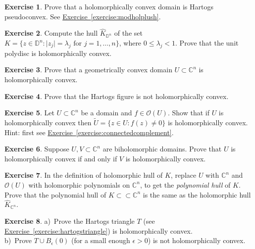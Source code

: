 \documentclass[12pt,openany]{book}
\newcommand{\sabs}[1]{\lvert {#1} \rvert}
\newcommand{\C}{{\mathbb{C}}}
\newcommand{\D}{{\mathbb{D}}}
\newcommand{\sO}{{\mathscr{O}}}
\newcommand{\myindex}[1]{#1\index{#1}}
\theoremstyle{plain}
\theoremstyle{remark}
\theoremstyle{definition}
\newenvironment{exbox}{%
    \def\FrameCommand{\vrule width 1pt \relax\hspace {10pt}}%
    \MakeFramed {\advance \hsize -\width \FrameRestore }%
}{%
    \endMakeFramed
}
\theoremstyle{exercise}
\newtheorem{exercise}{Exercise}[section]
\theoremstyle{example}
\newcommand{\exerciseref}[1]{\hyperref[#1]{Exercise~\ref*{#1}}}
\begin{document}
\begin{exbox}
\begin{exercise}
Prove that a holomorphically convex domain is Hartogs pseudoconvex.
See \exerciseref{exercise:modholplush}.
\end{exercise}

\begin{exercise}
Compute the hull
$\widehat{K}_{\D^n}$ of the set $K = \bigl\{ z \in \D^n : \sabs{z_j} =
\lambda_j \text{ for } j=1,\ldots,n \bigr\}$, where $0 \leq \lambda_j < 1$.
Prove that the unit polydisc is holomorphically convex.
\end{exercise}

\begin{exercise}
Prove that a geometrically convex domain $U \subset \C^n$
is holomorphically convex.
\end{exercise}

\begin{exercise}
Prove that the Hartogs figure is not holomorphically convex.
\end{exercise}

\begin{exercise}
Let $U \subset \C^n$ be a domain and $f \in \sO(U)$.  Show that if
$U$ is holomorphically convex then
$\widetilde{U} = \bigl\{ z \in U : f(z) \not= 0 \bigr\}$
is holomorphically convex.  
Hint: first see \exerciseref{exercise:connectedcomplement}.
\end{exercise}

\begin{exercise} \label{exercise:biholholconvex}
Suppose $U,V \subset \C^n$ are biholomorphic domains.
Prove that $U$ is holomorphically convex if and only if $V$ is
holomorphically convex.
\end{exercise}

\begin{exercise}
In the definition of holomorphic hull of $K$, replace $U$ with $\C^n$
and $\sO(U)$ with holomorphic polynomials on $\C^n$, to get the
\emph{\myindex{polynomial hull}} of $K$.  Prove that the polynomial hull of
$K \subset \subset \C^n$ is the same as the holomorphic hull $\widehat{K}_{\C^n}$.
\end{exercise}

\begin{exercise}
a)~Prove the Hartogs triangle $T$ (see \exerciseref{exercise:hartogstriangle})
is holomorphically convex.\\
b)~Prove $T \cup B_{\epsilon}(0)$ (for a small enough $\epsilon > 0$) is
not holomorphically convex.
\end{exercise}


\end{exbox}
\end{document}
